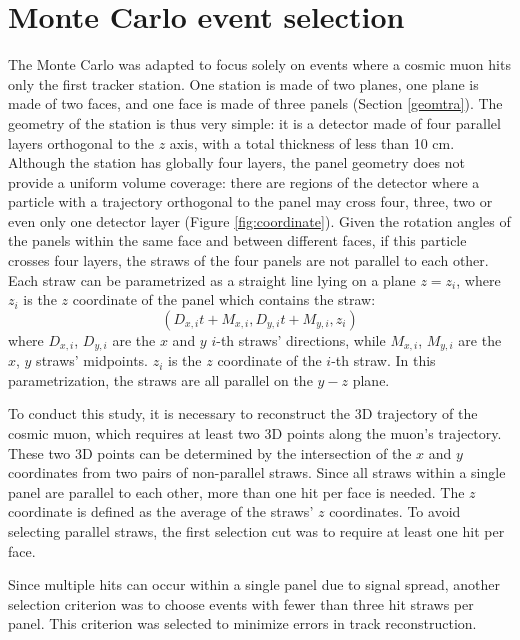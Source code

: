 \section{Monte Carlo event selection}\label{eventselection}

The Monte Carlo was adapted to focus solely on 
events where a cosmic muon hits only the first 
tracker station.
One station is made of two planes, one plane is made of two faces, and one face is
made of three panels (Section \ref{geomtra}). The geometry of the station 
is thus very simple: it is a detector made of four parallel 
layers orthogonal to the $z$ axis, with a total thickness of less than 10 cm.
Although the station has globally four layers, 
the panel geometry does not provide a uniform
volume coverage: there are regions of the 
detector where a particle with a trajectory orthogonal
to the panel may cross four, three, two or even only one 
detector layer (Figure \ref{fig:coordinate}). Given the
rotation angles of the panels within the same 
face and between different faces, if this particle
crosses four layers, the straws of the four 
panels are not parallel to each other.
Each straw can be parametrized as a straight line 
lying on a plane $z = z_i$, where $z_i$ is the $z$ 
coordinate of the panel which contains the straw:
\begin{equation}\label{equaretta}
    (D_{x,i}t+M_{x,i},D_{y,i}t+M_{y,i},z_i)
\end{equation}
where $D_{x,i}$, $D_{y,i}$ are the $x$ and $y$ 
$i$-th straws' directions, while $M_{x,i}$, $M_{y,i}$ 
are the $x$, $y$ straws' midpoints. $z_i$ is the 
$z$ coordinate of the $i$-th straw.
In this parametrization, the straws are all parallel 
on the $y-z$ plane.

To conduct this study, it is necessary to 
reconstruct the 3D trajectory of the cosmic muon, 
which requires at least two 3D points along the muon's 
trajectory. These two 3D points can be 
determined by the intersection of the 
$x$ and $y$ coordinates from two pairs 
of non-parallel straws. Since all straws 
within a single panel are parallel to each other, 
more than one hit per face is needed. The $z$ 
coordinate is defined as the average of the 
straws' $z$ coordinates. To avoid selecting parallel straws, 
the first selection cut 
was to require at least one hit per face.

Since multiple hits can occur within a 
single panel due to signal spread, another 
selection criterion was to choose events 
with fewer than three hit straws per panel. 
This criterion was selected to minimize errors 
in track reconstruction.
